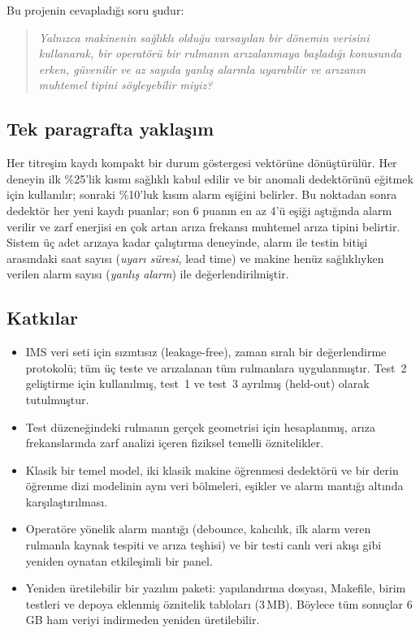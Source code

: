 \documentclass[11pt]{article}
\begin{document}
Bu projenin cevapladığı soru şudur:
\begin{quote}
\emph{Yalnızca makinenin sağlıklı olduğu varsayılan bir dönemin verisini kullanarak, bir operatörü bir
rulmanın arızalanmaya başladığı konusunda erken, güvenilir ve az sayıda yanlış alarmla uyarabilir ve
arızanın muhtemel tipini söyleyebilir miyiz?}
\end{quote}

\subsection{Tek paragrafta yaklaşım}
Her titreşim kaydı kompakt bir durum göstergesi vektörüne dönüştürülür. Her deneyin ilk \%25'lik
kısmı sağlıklı kabul edilir ve bir anomali dedektörünü eğitmek için kullanılır; sonraki \%10'luk kısım
alarm eşiğini belirler. Bu noktadan sonra dedektör her yeni kaydı puanlar; son 6 puanın en az 4'ü
eşiği aştığında alarm verilir ve zarf enerjisi en çok artan arıza frekansı muhtemel arıza tipini
belirtir. Sistem üç adet arızaya kadar çalıştırma deneyinde, alarm ile testin bitişi arasındaki saat
sayısı (\emph{uyarı süresi}, lead time) ve makine henüz sağlıklıyken verilen alarm sayısı (\emph{yanlış
alarm}) ile değerlendirilmiştir.

\subsection{Katkılar}
\begin{itemize}
  \item IMS veri seti için sızıntısız (leakage-free), zaman sıralı bir değerlendirme protokolü; tüm üç
        teste ve arızalanan tüm rulmanlara uygulanmıştır. Test~2 geliştirme için kullanılmış, test~1 ve
        test~3 ayrılmış (held-out) olarak tutulmuştur.
  \item Test düzeneğindeki rulmanın gerçek geometrisi için hesaplanmış, arıza frekanslarında zarf
        analizi içeren fiziksel temelli öznitelikler.
  \item Klasik bir temel model, iki klasik makine öğrenmesi dedektörü ve bir derin öğrenme dizi modelinin
        aynı veri bölmeleri, eşikler ve alarm mantığı altında karşılaştırılması.
  \item Operatöre yönelik alarm mantığı (debounce, kalıcılık, ilk alarm veren rulmanla kaynak tespiti
        ve arıza teşhisi) ve bir testi canlı veri akışı gibi yeniden oynatan etkileşimli bir panel.
  \item Yeniden üretilebilir bir yazılım paketi: yapılandırma dosyası, Makefile, birim testleri ve
        depoya eklenmiş öznitelik tabloları (3\,MB). Böylece tüm sonuçlar 6\,GB ham veriyi indirmeden
        yeniden üretilebilir.
\end{itemize}
\end{document}
